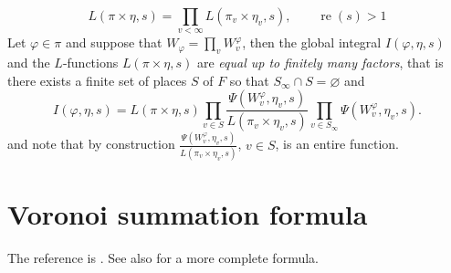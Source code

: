 \documentclass[a4paper,11pt]{amsart}
\theoremstyle{definition}
\newcommand{\real}{\operatorname{re}}
\begin{document}
\[ L(\pi\times\eta,s)=\prod_{v<\infty}L(\pi_v\times\eta_v,s), \qquad \real(s)>1\]
Let $\varphi \in \pi$ and suppose that $W_{\varphi} = \prod_{v}W_{v}^{\varphi}$, then the global integral $I(\varphi,\eta,s)$ and the $L$-functions $L(\pi\times\eta,s)$ are \emph{equal up to finitely many factors}, that is there exists a finite set of places $S$ of $F$ so that $S_{\infty}\cap S = \varnothing$ and  
\[I(\varphi,\eta,s) = L(\pi \times \eta,s)\prod_{v\in S}\frac{\Psi(W_v^{\varphi},\eta_v,s)}{L(\pi_v\times\eta_v,s)}\prod_{v\in S_{\infty}}\Psi(W_v^{\varphi},\eta_v,s). \] and note that by construction $\frac{\Psi(W_v^{\varphi},\eta_v,s)}{L(\pi_v\times\eta_v,s)}$, $v\in S$, is an entire function.






\section{Voronoi summation formula}\label{sec:voronoi}
The reference is \cite{IchinoTemplier}. See also \cite{2018VoronoiSF} for a more complete formula.
\end{document}
